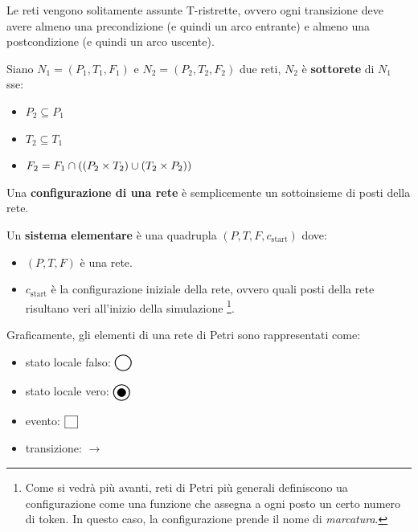 \begin{rem}
    Le reti vengono solitamente assunte T-ristrette, ovvero ogni transizione
    deve avere almeno una precondizione (e quindi un arco entrante) e
    almeno una postcondizione (e quindi un arco uscente).
\end{rem}

\begin{defn}
    Siano $N_1 = (P_1, T_1, F_1)$ e $N_2 = (P_2, T_2, F_2)$ due reti,
    $N_2$ è \textbf{sottorete} di $N_1$ sse:
    \begin{itemize}
        \item $P_2 \subseteq P_1$
        \item $T_2 \subseteq T_1$
        \item $F_2 = F_1 \cap \left(\left(P_2 \times T_2\right) \cup \left(T_2 \times P_2\right)\right)$
    \end{itemize}
\end{defn}

\begin{defn}
    Una \textbf{configurazione di una rete} è semplicemente un sottoinsieme
    di posti della rete.
\end{defn}

\begin{defn}
    Un \textbf{sistema elementare} è una quadrupla  $(P, T, F, c_{\text{start}})$
    dove:
    \begin{itemize}
        \item $(P, T, F)$ è una rete.
        \item $c_{\text{start}}$ è la configurazione iniziale della rete, ovvero
        quali posti della rete risultano veri all'inizio della simulazione
        \footnote{Come si vedrà più avanti, reti di Petri più generali
        definiscono ua configurazione come una funzione che assegna a ogni
        posto un certo numero di token. In questo caso, la configurazione
        prende il nome di \textit{marcatura}.}.
    \end{itemize}
\end{defn}

Graficamente, gli elementi di una rete di Petri sono rappresentati come:
\begin{itemize}
    \item stato locale falso: $\fPlace$
    \item stato locale vero: $\tPlace$
    \item evento: $\event$
    \item transizione: $\longrightarrow$
\end{itemize}

